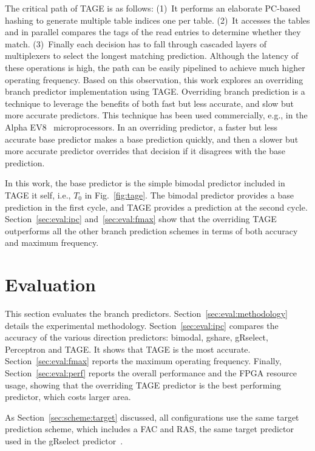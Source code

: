 \documentclass[conference]{IEEEtran}
\begin{document}
The critical path of TAGE is as follows: (1)~It performs an elaborate PC-based hashing to generate multiple table indices one per table. (2)~It accesses the tables and in parallel compares the tags of the read entries to determine whether they match. (3)~Finally each decision has to fall through cascaded layers of multiplexers to select the longest matching prediction. Although the latency of these operations is high, the path can be easily pipelined to achieve much higher operating frequency. Based on this observation, this work explores an overriding branch predictor implementation using TAGE. Overriding branch prediction is a technique to leverage the benefits of both fast but less accurate, and slow but more accurate predictors. This technique has been used commercially, e.g., in the Alpha EV8~\cite{alphaEV8} microprocessors. In an overriding predictor, a faster but less accurate base predictor makes a base prediction quickly, and then a slower but more accurate predictor overrides that decision if it disagrees with the base prediction. 

In this work, the base predictor is the simple bimodal predictor included in TAGE it self, i.e., $T_0$ in Fig.~\ref{fig:tage}. The bimodal predictor provides a base prediction in the first cycle, and TAGE provides a prediction at the second cycle. Section~\ref{sec:eval:ipc} and~\ref{sec:eval:fmax} show that the overriding TAGE outperforms all the other branch prediction schemes in terms of both accuracy and maximum frequency.

\section{Evaluation}
\label{sec:eval}
This section evaluates the branch predictors. Section~\ref{sec:eval:methodology} details the experimental methodology. Section~\ref{sec:eval:ipc} compares the accuracy of the various direction predictors: bimodal, gshare, gRselect, Perceptron and TAGE. It shows that TAGE is the most accurate. Section~\ref{sec:eval:fmax} reports the maximum operating frequency. Finally, Section~\ref{sec:eval:perf} reports the overall performance and the FPGA resource usage, showing that the overriding TAGE predictor is the best performing predictor, which costs larger area.

As Section~\ref{sec:scheme:target} discussed, all configurations use the same target prediction scheme, which includes a FAC and RAS, the same target predictor used in the gRselect predictor~\cite{grselect}.
\end{document}
